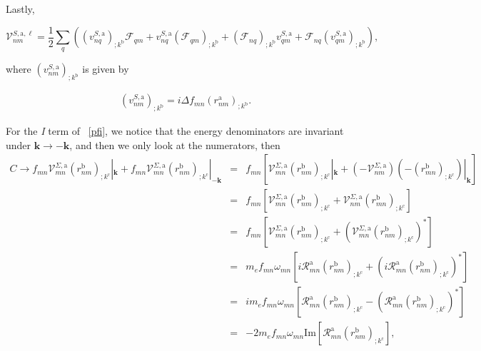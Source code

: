 \documentclass[11pt]{article}
\begin{document}
Lastly,

\begin{equation}\label{a.3b}
\mathcal{V}^{S,\text{a},\ell}_{nm} = \frac{1}{2}\sum_{q}\left((v^{S,\text{a}}_{nq})_{;k^\text{b}}\mathcal{F}_{qm} + v^{S,\text{a}}_{nq}(\mathcal{F}_{qm})_{;k^\text{b}} + (\mathcal{F}_{nq})_{;k^\text{b}}v_{qm}^{S,\text{a}} + \mathcal{F}_{nq} (v_{qm}^{S,\text{a}})_{;k^\text{b}}\right),
\end{equation}

where $\left(v^{S,\text{a}}_{nm}\right)_{;k^\text{b}}$ is given by

\begin{eqnarray}\label{choni.1}
\left(v^{S,\text{a}}_{nm}\right)_{;k^\text{b}}=i\Delta f_{mn}(r^\text{a}_{nm})_{;k^\text{b}}.
\end{eqnarray}

For the \emph{I} term of ~\eqref{pfi}, we notice that the energy denominators are invariant under $\mathbf{k} \rightarrow - \mathbf{k}$, and then we only look at the numerators, then
\begin{eqnarray}\label{ct}
C \rightarrow f_{mn}\mathcal{V}^{\Sigma,\text{a}}_{mn}(r^{\text{b}}_{nm})_{;k^{\text{c}}}|_{\mathbf{k}} + f_{mn}\mathcal{V}^{\Sigma,\text{a}}_{mn}(r^{\text{b}}_{nm})_{;k^{\text{c}}}|_{-\mathbf{k}}
&=& f_{mn}\left[\mathcal{V}^{\Sigma,\text{a}}_{mn}(r^{\text{b}}_{nm})_{;k^{\text{c}}}|_{\mathbf{k}} + (-\mathcal{V}^{\Sigma,\text{a}}_{nm})(-(r^{\text{b}}_{mn})_{;k^{\text{c}}})|_{\mathbf{k}}\right]\nonumber\\
&=& f_{mn}\left[\mathcal{V}^{\Sigma,\text{a}}_{mn}(r^{\text{b}}_{nm})_{;k^{\text{c}}} + \mathcal{V}^{\Sigma,\text{a}}_{nm}(r^{\text{b}}_{mn})_{;k^{\text{c}}}\right]\nonumber\\
&=& f_{mn}\left[\mathcal{V}^{\Sigma,\text{a}}_{mn}(r^{\text{b}}_{nm})_{;k^{\text{c}}} + (\mathcal{V}^{\Sigma,\text{a}}_{mn}(r^{\text{b}}_{nm})_{;k^{\text{c}}})^*\right]\nonumber\\
&=& m_ef_{mn}\omega_{mn}\left[i\mathcal{R}^{\text{a}}_{mn}(r^{\text{b}}_{nm})_{;k^{\text{c}}} + (i\mathcal{R}^{\text{a}}_{mn}(r^{\text{b}}_{nm})_{;k^{\text{c}}})^*\right]\nonumber\\
&=& im_ef_{mn}\omega_{mn}\left[\mathcal{R}^{\text{a}}_{mn}(r^{\text{b}}_{nm})_{;k^{\text{c}}} - (\mathcal{R}^{\text{a}}_{mn}(r^{\text{b}}_{nm})_{;k^{\text{c}}})^*\right]\nonumber\\
&=& -2m_ef_{mn}\omega_{mn}\mathrm{Im}[\mathcal{R}^{\text{a}}_{mn}(r^{\text{b}}_{nm})_{;k^{\text{c}}}],
\end{eqnarray}
\end{document}
